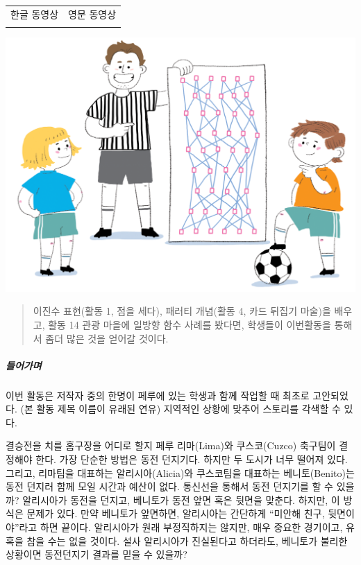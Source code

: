 \documentclass[]{article}
\begin{document}
\begin{longtable}[c]{@{}ll@{}}
\toprule
\begin{minipage}[t]{0.47\columnwidth}\raggedright\strut
한글 동영상
\strut\end{minipage} &
\begin{minipage}[t]{0.47\columnwidth}\raggedright\strut
영문 동영상
\strut\end{minipage}\tabularnewline
\begin{minipage}[t]{0.47\columnwidth}\raggedright\strut
\strut\end{minipage} &
\begin{minipage}[t]{0.47\columnwidth}\raggedright\strut
\strut\end{minipage}\tabularnewline
\bottomrule
\end{longtable}

\includegraphics{csunplugged/05-part/img/ch18-crypto/17-crypto-01-peruvian-coin.png}

\begin{quote}
이진수 표현(활동 1, 점을 세다), 패러티 개념(활동 4, 카드 뒤집기 마술)을
배우고, 활동 14 관광 마을에 일방향 함수 사례를 봤다면, 학생들이
이번활동을 통해서 좀더 많은 것을 얻어갈 것이다.
\end{quote}

\subparagraph{들어가며}\label{section-240}

이번 활동은 저작자 중의 한명이 페루에 있는 학생과 함께 작업할 때 최초로
고안되었다. (본 활동 제목 이름이 유래된 연유) 지역적인 상황에 맞추어
스토리를 각색할 수 있다.

결승전을 치를 홈구장을 어디로 할지 페루 리마(Lima)와 쿠스코(Cuzco)
축구팀이 결정해야 한다. 가장 단순한 방법은 동전 던지기다. 하지만 두
도시가 너무 떨어져 있다. 그리고, 리마팀을 대표하는 알리시아(Alicia)와
쿠스코팀을 대표하는 베니토(Benito)는 동전 던지러 함께 모일 시간과 예산이
없다. 통신선을 통해서 동전 던지기를 할 수 있을까? 알리시아가 동전을
던지고, 베니토가 동전 앞면 혹은 뒷면을 맞춘다. 하지만, 이 방식은 문제가
있다. 만약 베니토가 앞면하면, 알리시아는 간단하게 ``미안해 친구,
뒷면이야''라고 하면 끝이다. 알리시아가 원래 부정직하지는 않지만, 매우
중요한 경기이고, 유혹을 참을 수는 없을 것이다. 설사 알리시아가
진실된다고 하더라도, 베니토가 불리한 상황이면 동전던지기 결과를 믿을 수
있을까?
\end{document}

